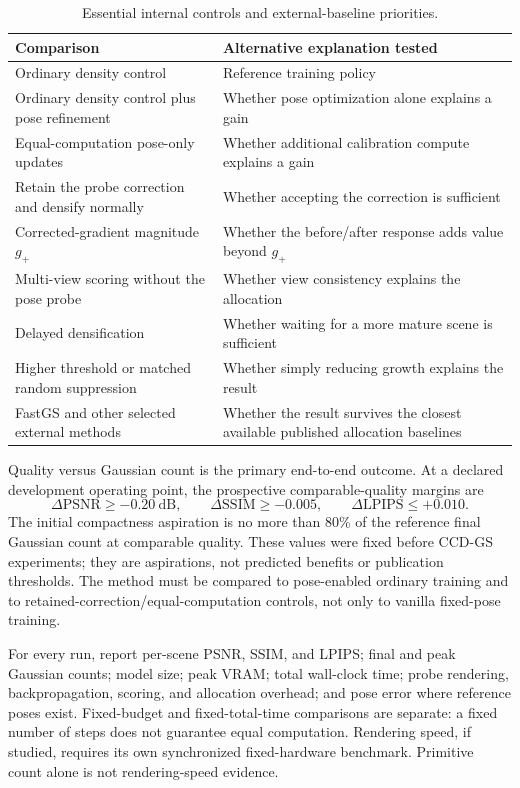 \documentclass[10pt]{article}
\begin{document}
\begin{table}[htbp]
\centering
\small
\begin{tabularx}{\linewidth}{@{}lY@{}}
\toprule
\textbf{Comparison} & \textbf{Alternative explanation tested}\\
\midrule
Ordinary density control & Reference training policy\\
Ordinary density control plus pose refinement & Whether pose optimization alone explains a gain\\
Equal-computation pose-only updates & Whether additional calibration compute explains a gain\\
Retain the probe correction and densify normally & Whether accepting the correction is sufficient\\
Corrected-gradient magnitude \(g_+\) & Whether the before/after response adds value beyond \(g_+\)\\
Multi-view scoring without the pose probe & Whether view consistency explains the allocation\\
Delayed densification & Whether waiting for a more mature scene is sufficient\\
Higher threshold or matched random suppression & Whether simply reducing growth explains the result\\
FastGS and other selected external methods & Whether the result survives the closest available published allocation baselines\\
\bottomrule
\end{tabularx}
\caption{Essential internal controls and external-baseline priorities.}
\label{tab:controls}
\end{table}

Quality versus Gaussian count is the primary end-to-end outcome. At a declared
development operating point, the prospective comparable-quality margins are
\[
\Delta\mathrm{PSNR}\geq-0.20\ \mathrm{dB},\qquad
\Delta\mathrm{SSIM}\geq-0.005,\qquad
\Delta\mathrm{LPIPS}\leq+0.010.
\]
The initial compactness aspiration is no more than 80\% of the reference
final Gaussian count at comparable quality. These values were fixed before
CCD-GS experiments; they are aspirations, not predicted benefits or
publication thresholds. The method must be compared to pose-enabled ordinary
training and to retained-correction/equal-computation controls, not only to
vanilla fixed-pose training.

For every run, report per-scene PSNR, SSIM, and LPIPS; final and peak Gaussian
counts; model size; peak VRAM; total wall-clock time; probe rendering,
backpropagation, scoring, and allocation overhead; and pose error where
reference poses exist. Fixed-budget and fixed-total-time comparisons are
separate: a fixed number of steps does not guarantee equal computation.
Rendering speed, if studied, requires its own synchronized fixed-hardware
benchmark. Primitive count alone is not rendering-speed evidence.
\end{document}
